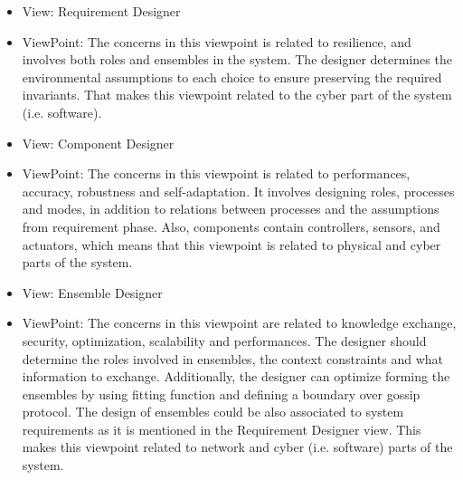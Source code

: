 \begin{itemize}
 
    \item View: Requirement Designer
    \item ViewPoint: The concerns in this viewpoint is related to resilience, and involves both roles and ensembles in the system. The designer determines the environmental assumptions to each choice to ensure preserving the required invariants. That makes this viewpoint related to the cyber part of the system (i.e. software).
    
    \item View: Component Designer
    \item ViewPoint: The concerns in this viewpoint is related to performances, accuracy, robustness and self-adaptation. It involves designing roles, processes and modes, in addition to relations between processes and the assumptions from requirement phase. Also, components contain controllers, sensors, and actuators, which means that this viewpoint is related to physical and cyber parts of the system.   
    
    \item View: Ensemble Designer
    \item ViewPoint: The concerns in this viewpoint are related to knowledge exchange, security, optimization, scalability and performances. The designer should determine the roles involved in ensembles, the context constraints and what information to exchange. Additionally, the designer can optimize forming the ensembles by using fitting function and defining a boundary over gossip protocol. The design of ensembles could be also associated to system requirements as it is mentioned in the Requirement Designer view. This makes this viewpoint related to network and cyber (i.e. software) parts of the system.
    
\end{itemize}
